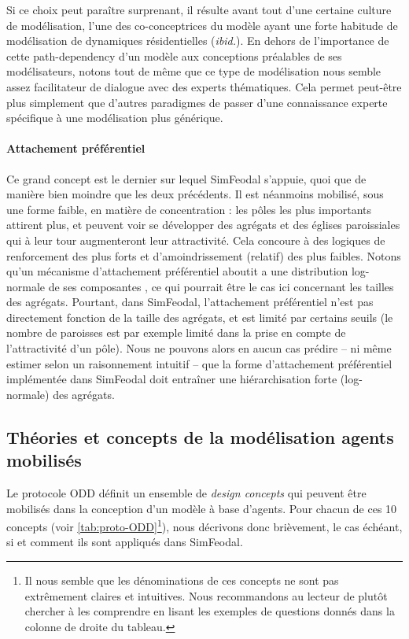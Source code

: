 Si ce choix peut paraître surprenant, il résulte avant tout d'une certaine \og culture de modélisation\fg{}, l'une des co-conceptrices du modèle ayant une forte habitude de modélisation de dynamiques résidentielles (\textit{ibid.}).
En dehors de l'importance de cette \og path-dependency\fg{} d'un modèle aux conceptions préalables de ses modélisateurs, notons tout de même que ce type de modélisation nous semble assez facilitateur de dialogue avec des experts thématiques.
Cela permet peut-être plus simplement que d'autres paradigmes de passer d'une connaissance experte spécifique à une modélisation plus générique.

\paragraph{Attachement préférentiel} Ce \og grand concept\fg{} est le dernier sur lequel SimFeodal s'appuie, quoi que de manière bien moindre que les deux précédents.
Il est néanmoins mobilisé, sous une forme faible, en matière de concentration : les pôles les plus importants attirent plus, et peuvent voir se développer des agrégats et des églises paroissiales qui à leur tour augmenteront leur attractivité.
Cela concoure à des logiques de renforcement des plus forts et d'amoindrissement (relatif) des plus faibles.
Notons qu'un mécanisme d'attachement préférentiel aboutit a une distribution log-normale de ses composantes \autocite{barabasi_emergence_1999}, ce qui pourrait être le cas ici concernant les tailles des agrégats.
Pourtant, dans SimFeodal, l'attachement préférentiel n'est pas directement fonction de la taille des agrégats, et est limité par certains seuils (le nombre de paroisses est par exemple limité dans la prise en compte de l'attractivité d'un pôle).
Nous ne pouvons alors en aucun cas prédire -- ni même estimer selon un raisonnement intuitif -- que la forme d'attachement préférentiel implémentée dans SimFeodal doit entraîner une hiérarchisation forte (log-normale) des agrégats. 

\subsection{Théories et concepts de la modélisation agents mobilisés}

Le protocole ODD définit un ensemble de \textit{design concepts} qui peuvent être mobilisés dans la conception d'un modèle à base d'agents.
Pour chacun de ces 10 concepts (voir \cref{tab:proto-ODD}\footnote{
Il nous semble que les dénominations de ces concepts ne sont pas extrêmement claires et intuitives.
Nous recommandons au lecteur de plutôt chercher à les comprendre en lisant les exemples de questions donnés dans la colonne de droite du tableau.
}), nous décrivons donc brièvement, le cas échéant, si et comment ils sont appliqués dans SimFeodal.

